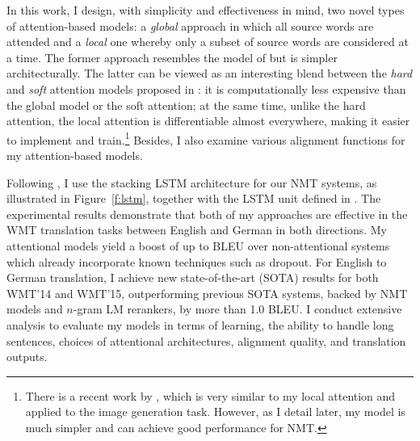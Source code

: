 In this work, I design, with simplicity and effectiveness in mind, two novel
types of attention-based models: a {\it global} approach in which all source
words are attended and a {\it local} one whereby only a subset of source words
are considered at a time. The former approach resembles the model of
\cite{bog15} but is simpler architecturally. The latter can be viewed as an
interesting blend between the {\it hard} and {\it soft} attention models
proposed in \cite{xu15}: it is computationally less expensive than the
global model or the soft attention; at the same time, unlike the hard attention,
the local attention is
differentiable almost everywhere, making it easier to implement and
train.\footnote{There is a recent work by , which is very
similar to my local attention and applied to the image generation task.
However, as I detail later, my model is much simpler and can achieve good performance for NMT.} Besides, I also examine various
alignment functions for my attention-based models.

Following \cite{sutskever14,luong15}, I use the stacking LSTM architecture for our NMT systems, as illustrated in Figure~\ref{f:lstm}, together with the LSTM unit defined in \cite{zaremba14}.
The experimental results demonstrate that both of my approaches are
effective in the WMT translation tasks between English and German in  both
directions. My attentional models yield a boost of up to \attngain{} BLEU over
non-attentional systems which already incorporate known techniques such as
dropout. For English to German translation, I achieve new state-of-the-art
(SOTA)
results for both WMT'14 and WMT'15, outperforming previous SOTA systems, backed by
NMT models and $n$-gram LM rerankers, by more than 1.0 BLEU. I conduct
extensive analysis to evaluate my models in terms of learning, the ability to
handle long sentences, choices of attentional architectures, alignment quality, and translation
outputs. 
